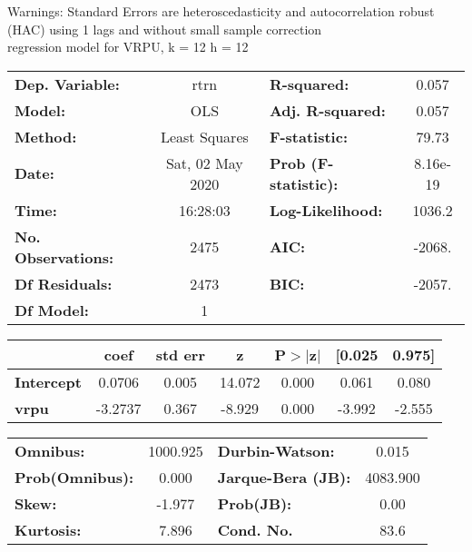 Warnings: \newline
 [1] Standard Errors are heteroscedasticity and autocorrelation robust (HAC) using 1 lags and without small sample correction\\ 

regression model for VRPU, k = 12 h = 12\begin{center}
\begin{tabular}{lclc}
\toprule
\textbf{Dep. Variable:}    &       rtrn       & \textbf{  R-squared:         } &     0.057   \\
\textbf{Model:}            &       OLS        & \textbf{  Adj. R-squared:    } &     0.057   \\
\textbf{Method:}           &  Least Squares   & \textbf{  F-statistic:       } &     79.73   \\
\textbf{Date:}             & Sat, 02 May 2020 & \textbf{  Prob (F-statistic):} &  8.16e-19   \\
\textbf{Time:}             &     16:28:03     & \textbf{  Log-Likelihood:    } &    1036.2   \\
\textbf{No. Observations:} &        2475      & \textbf{  AIC:               } &    -2068.   \\
\textbf{Df Residuals:}     &        2473      & \textbf{  BIC:               } &    -2057.   \\
\textbf{Df Model:}         &           1      & \textbf{                     } &             \\
\bottomrule
\end{tabular}
\begin{tabular}{lcccccc}
                   & \textbf{coef} & \textbf{std err} & \textbf{z} & \textbf{P$> |$z$|$} & \textbf{[0.025} & \textbf{0.975]}  \\
\midrule
\textbf{Intercept} &       0.0706  &        0.005     &    14.072  &         0.000        &        0.061    &        0.080     \\
\textbf{vrpu}      &      -3.2737  &        0.367     &    -8.929  &         0.000        &       -3.992    &       -2.555     \\
\bottomrule
\end{tabular}
\begin{tabular}{lclc}
\textbf{Omnibus:}       & 1000.925 & \textbf{  Durbin-Watson:     } &    0.015  \\
\textbf{Prob(Omnibus):} &   0.000  & \textbf{  Jarque-Bera (JB):  } & 4083.900  \\
\textbf{Skew:}          &  -1.977  & \textbf{  Prob(JB):          } &     0.00  \\
\textbf{Kurtosis:}      &   7.896  & \textbf{  Cond. No.          } &     83.6  \\
\bottomrule
\end{tabular}
\end{center}

